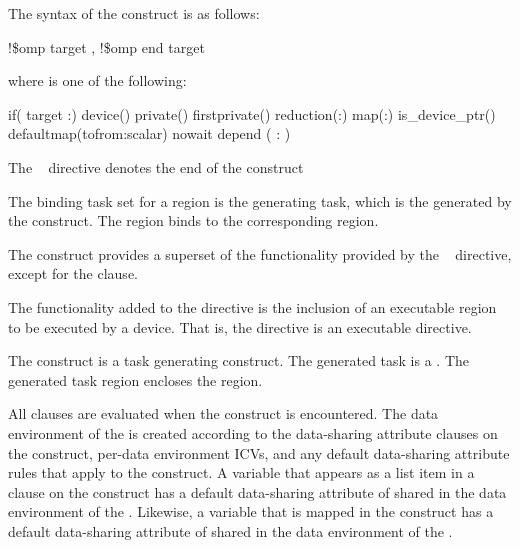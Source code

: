 \begin{samepage}
\smallskip
\begin{fortranspecific}
The syntax of the  construct is as follows:

\begin{boxedcode}
!\$omp target \plc{[clause[ [},\plc{] clause] ... ]}
!\$omp end target
\end{boxedcode}

where  is one of the following:

\begin{indentedcodelist}
if(\plc{[} target :\plc{] scalar-logical-expression})
device()
private()
firstprivate()
reduction(:)
map(\plc{[[map-type-modifier[,]] map-type}:\plc{ ] list})
is\_device\_ptr()
defaultmap(tofrom:scalar)
nowait
depend ( : )
\end{indentedcodelist}

The ~ directive denotes the end of the  construct
\end{fortranspecific}
\end{samepage}

\binding
The binding task set for a  region is the
generating task, which is the  generated
by the  construct. The 
region binds to the corresponding  region.

\descr
The  construct provides a superset of the functionality
provided by the ~ directive, except for 
the  clause.

The functionality added to the  directive is the inclusion of an executable region to be executed by a device. That is, the  directive is an executable directive.

The  construct is a task generating construct.  The generated task is a .  The generated task region encloses the  region.

All clauses are evaluated when the  construct is encountered.  The data environment of the  is created according to the data-sharing attribute clauses on the  construct, per-data environment ICVs, and any default data-sharing attribute rules that apply to the  construct.  A variable that appears as a list item in a  clause on the  construct has a default data-sharing attribute of shared in the data environment of the . Likewise, a variable that is mapped in the  construct has a default data-sharing attribute of shared in the data environment of the .

